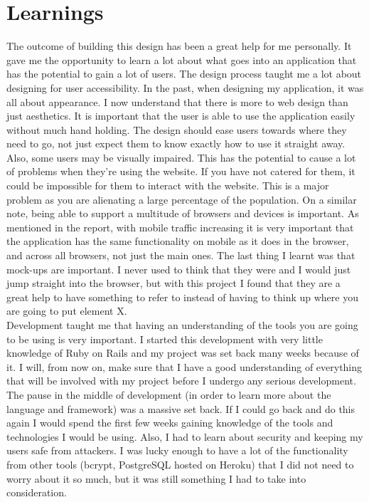 \section{Learnings}
The outcome of building this design has been a great help for me personally. It gave me the opportunity to learn a lot about what goes into an application that has the potential to gain a lot of users. The design process taught me a lot about designing for user accessibility. In the past, when designing my application, it was all about appearance. I now understand that there is more to web design than just aesthetics. It is important that the user is able to use the application easily without much hand holding. The design should ease users towards where they need to go, not just expect them to know exactly how to use it straight away. Also, some users may be visually impaired. This has the potential to cause a lot of problems when they're using the website. If you have not catered for them, it could be impossible for them to interact with the website. This is a major problem as you are alienating a large percentage of the population. On a similar note, being able to support a multitude of browsers and devices is important. As mentioned in the report, with mobile traffic increasing it is very important that the application has the same functionality on mobile as it does in the browser, and across all browsers, not just the main ones. The last thing I learnt was that mock-ups are important. I never used to think that they were and I would just jump straight into the browser, but with this project I found that they are a great help to have something to refer to instead of having to think up where you are going to put element X.\\

Development taught me that having an understanding of the tools you are going to be using is very important. I started this development with very little knowledge of Ruby on Rails and my project was set back many weeks because of it. I will, from now on, make sure that I have a good understanding of everything that will be involved with my project before I undergo any serious development. The pause in the middle of development (in order to learn more about the language and framework) was a massive set back. If I could go back and do this again I would spend the first few weeks gaining knowledge of the tools and technologies I would be using. Also, I had to learn about security and keeping my users safe from attackers. I was lucky enough to have a lot of the functionality from other tools (bcrypt, PostgreSQL hosted on Heroku) that I did not need to worry about it so much, but it was still something I had to take into consideration.\\

